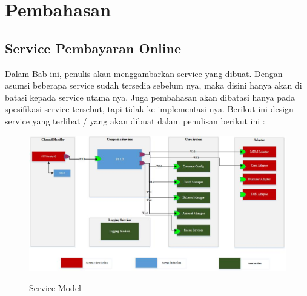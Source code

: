 \documentclass[9pt,twocolumn,twoside]{Gunadarma}
\begin{document}
\section{Pembahasan}

\subsection{Service Pembayaran Online}
Dalam Bab ini, penulis akan menggambarkan service yang dibuat. Dengan asumsi beberapa service sudah tersedia sebelum nya, maka disini hanya akan di batasi kepada service utama nya. Juga pembahasan akan dibatasi hanya pada spesifikasi service tersebut, tapi tidak ke implementasi nya. Berikut ini design service yang terlibat / yang akan dibuat dalam penulisan berikut ini :
\begin{figure}[htbp]
\begin{center}
\includegraphics[width=1\columnwidth]{BuildingBlockDiagram.eps} \label{fig:3-noFCase1}
\end{center}
\caption{Service Model}
\end{figure}
 
\end{document}
